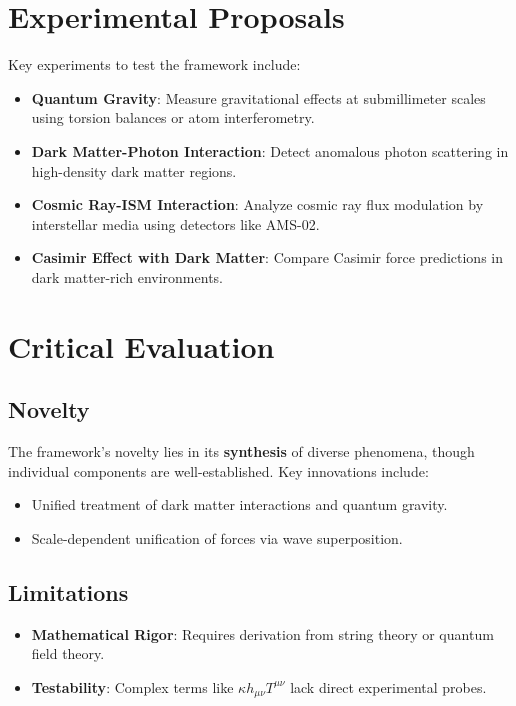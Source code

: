\documentclass{article}
\begin{document}
\section{Experimental Proposals}
Key experiments to test the framework include:
\begin{itemize}
    \item \textbf{Quantum Gravity}: Measure gravitational effects at submillimeter scales using torsion balances or atom interferometry.
    \item \textbf{Dark Matter-Photon Interaction}: Detect anomalous photon scattering in high-density dark matter regions.
    \item \textbf{Cosmic Ray-ISM Interaction}: Analyze cosmic ray flux modulation by interstellar media using detectors like AMS-02.
    \item \textbf{Casimir Effect with Dark Matter}: Compare Casimir force predictions in dark matter-rich environments.
\end{itemize}

\section{Critical Evaluation}
\subsection{Novelty}
The framework's novelty lies in its \textbf{synthesis} of diverse phenomena, though individual components are well-established. Key innovations include:
\begin{itemize}
    \item Unified treatment of dark matter interactions and quantum gravity.
    \item Scale-dependent unification of forces via wave superposition.
\end{itemize}

\subsection{Limitations}
\begin{itemize}
    \item \textbf{Mathematical Rigor}: Requires derivation from string theory or quantum field theory.
    \item \textbf{Testability}: Complex terms like \( \kappa h_{\mu\nu} T^{\mu\nu} \) lack direct experimental probes.
\end{itemize}
\end{document}
